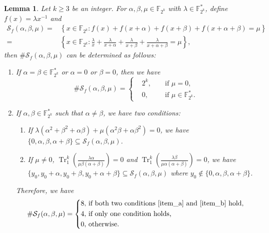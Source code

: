 \documentclass{article}
\newcommand{\F}{\mathbb{F}}
\newcommand{\0}{\textbf{0}}
\newcommand{\1}{\textbf{1}}
\newcommand{\TRACE}{\operatorname{Tr}_1^k}
\theoremstyle{plain}
\newtheorem{lemma}{Lemma}
\begin{document}
    \begin{lemma}\label{lemma:num_sol_second_dev}
        Let $k\ge 3$ be an integer.
        For $\alpha,\beta,\mu\in\F_{2^k}$ with $\lambda\in\F_{2^k}^*$, define $f(x)=\lambda x^{-1}$ and
        \begin{align*}
            \mathcal{S}_f(\alpha,\beta,\mu)=&\left\{x\in\F_{2^k} : f(x)+f(x+\alpha)+f(x+\beta)+f(x+\alpha+\beta)=\mu\right\}\\
            =&\left\{ x\in\F_{2^k} : \frac{\lambda}{x}+\frac{\lambda}{x+\alpha}+\frac{\lambda}{x+\beta}+\frac{\lambda}{x+\alpha+\beta}=\mu \right\},
        \end{align*}
        then $\#\mathcal{S}_f(\alpha,\beta,\mu)$ can be determined as follows:
        \begin{enumerate}[label=(\arabic{*})]
            \item If $\alpha=\beta\in\F_{2^k}^*$ or $\alpha=0$ or $\beta=0$, then we have
            \[\#\mathcal{S}_f(\alpha,\beta,\mu) = \left\{
                \begin{alignedat}{2}
                    &2^k,&&\text{ if }\mu = 0,\\
                    &0,  &&\text{ if }\mu\in\F_{2^k}^*.
                \end{alignedat}\right.\]
            \item If $\alpha,\beta\in\F_{2^k}^*$ such that $\alpha\ne\beta$, we have two conditions:
            \begin{enumerate}[ref=(\alph{*})]
                \item If $\lambda(\alpha^2+\beta^2+\alpha\beta)+\mu(\alpha^2\beta+\alpha\beta^2)=0$, we have
                $\{0,\alpha,\beta,\alpha+\beta\}\subseteq\mathcal{S}_f(\alpha,\beta,\mu)$.\label{item_a}
                \item If $\mu\ne 0$, $\TRACE\left(\frac{\lambda\alpha}{\mu \beta(\alpha+\beta)}\right)=0$ and
                $\TRACE\left(\frac{\lambda \beta}{\mu \alpha(\alpha+\beta)}\right)=0$, we have
                $\{y_0,y_0+\alpha,y_0+\beta,y_0+\alpha+\beta\}\subseteq\mathcal{S}_f(\alpha,\beta,\mu)$ where $y_0\notin\{0,\alpha,\beta,\alpha+\beta\}$.\label{item_b}
            \end{enumerate}
            Therefore, we have
            \[\#\mathcal{S}_f(\alpha,\beta,\mu) = \left\{
                \begin{alignedat}{2}
                    &8,&&\text{ if both two conditions }\ref{item_a}\text{ and }\ref{item_b}\text{ hold,}\\
                    &4,&&\text{ if only one condition holds,}\\
                    &0,&&\text{ otherwise.}
                \end{alignedat}\right.\]
        \end{enumerate}
    \end{lemma}
\end{document}
